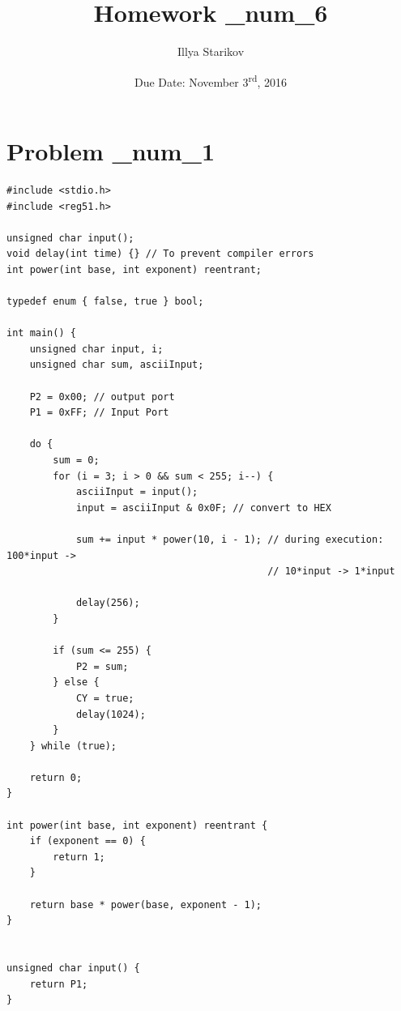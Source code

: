 \documentclass[12pt]{article}
\title{Homework \_num_6}
\date{Due Date: November 3\textsuperscript{rd}, 2016}
\author{Illya Starikov}
\begin{document}
\maketitle

\section{Problem \_num_1}
\begin{verbatim}
#include <stdio.h>
#include <reg51.h>

unsigned char input();
void delay(int time) {} // To prevent compiler errors
int power(int base, int exponent) reentrant;

typedef enum { false, true } bool;

int main() {
    unsigned char input, i;
    unsigned char sum, asciiInput;

    P2 = 0x00; // output port
    P1 = 0xFF; // Input Port

    do {
        sum = 0;
        for (i = 3; i > 0 && sum < 255; i--) {
            asciiInput = input();
            input = asciiInput & 0x0F; // convert to HEX

            sum += input * power(10, i - 1); // during execution: 100*input ->
                                             // 10*input -> 1*input

            delay(256);
        }

        if (sum <= 255) {
            P2 = sum;
        } else {
            CY = true;
            delay(1024);
        }
    } while (true);

    return 0;
}

int power(int base, int exponent) reentrant {
    if (exponent == 0) {
        return 1;
    }

    return base * power(base, exponent - 1);
}


unsigned char input() {
    return P1;
}
\end{verbatim}
\end{document}
